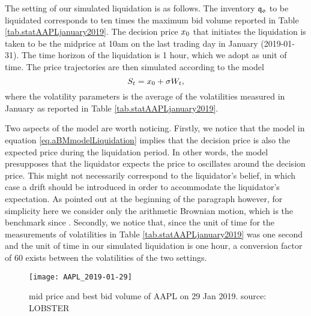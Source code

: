 \documentclass[10pt,a4paper]{article}
\begin{document}
The setting of our simulated liquidation is as follows. The inventory $\mathfrak{q_0}$ to be liquidated corresponds to ten times the maximum bid volume reported in Table \ref{tab.statAAPLjanuary2019}. The decision price $x_0$  that initiates the liquidation is taken to be the midprice at 10am on the last trading day in January (2019-01-31). The time horizon of the liquidation is 1 hour, which we adopt as unit of time. The price trajectories are then simulated according to the model 
 \begin{equation}\label{eq.aBMmodelLiquidation}
 S_t = x_0 + \sigma W_t,
 \end{equation}
where the volatility parameters is the average of the volatilities measured in January as reported in Table \ref{tab.statAAPLjanuary2019}.

Two aspects of the model are worth noticing. Firstly, we notice that the model in equation \eqref{eq.aBMmodelLiquidation} implies that the decision price is also the expected price during the liquidation period. In other words, the model presupposes that the liquidator expects the price to oscillates around the decision price. This might not necessarily correspond to the liquidator's belief, in which case a drift should be introduced in order to accommodate the liquidator's expectation. As pointed out at the beginning of the  paragraph however, for simplicity here we consider only the arithmetic Brownian motion, which is the benchmark since \cite{AC00opt}.
Secondly, we notice that, since the unit of time for the  measurements of volatilities in Table \ref{tab.statAAPLjanuary2019} was one second and the unit of time in our simulated liquidation is one hour, a conversion factor of 60 exists between the volatilities of the two settings.  	

\begin{center}
\begin{figure}
	\centering
	\texttt{[image: AAPL\_2019-01-29]}
	\caption{{mid price and best bid volume of AAPL on 29 Jan 2019. source: LOBSTER}}
	\label{fig.AAPL_20190129}
\end{figure}

\end{center}
\end{document}
